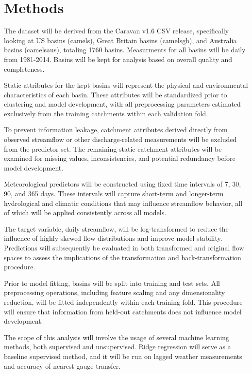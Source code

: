 \section{Methods}\label{methods}

The dataset will be derived from the Caravan v1.6 CSV release,
specifically looking at US basins (camels), Great Britain basins
(camelsgb), and Australia basins (camelsaus), totaling 1760 basins.
Measurments for all basins will be daily from 1981-2014. Basins will be
kept for analysis based on overall quality and completeness.

Static attributes for the kept basins will represent the physical and
environmental characteristics of each basin. These attributes will be
standardized prior to clustering and model development, with all
preprocessing parameters estimated exclusively from the training
catchments within each validation fold.

To prevent information leakage, catchment attributes derived directly
from observed streamflow or other discharge-related measurements will be
excluded from the predictor set. The remaining static catchment
attributes will be examined for missing values, inconsistencies, and
potential redundancy before model development.

Meteorological predictors will be constructed using fixed time intervals
of 7, 30, 90, and 365 days. These intervals will capture short-term and
longer-term hydrological and climatic conditions that may influence
streamflow behavior, all of which will be applied consistently across
all models.

The target variable, daily streamflow, will be log-transformed to reduce
the influence of highly skewed flow distributions and improve model
stability. Predictions will subsequently be evaluated in both
transformed and original flow spaces to assess the implications of the
transformation and back-transformation procedure.

Prior to model fitting, basins will be split into training and test
sets. All preprocessing operations, including feature scaling and any
dimensionality reduction, will be fitted independently within each
training fold. This procedure will ensure that information from held-out
catchments does not influence model development.

The scope of this analysis will involve the usage of several machine
learning methods, both supervised and unsupervised. Ridge regression
will serve as a baseline supervised method, and it will be run on lagged
weather measurements and accuracy of nearest-gauge transfer.

